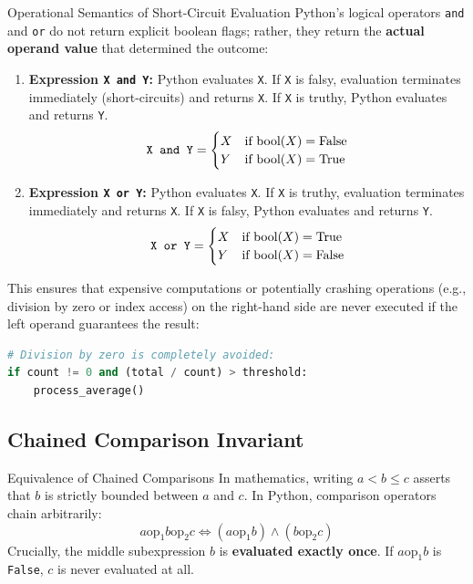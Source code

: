 \begin{theorembox}{Operational Semantics of Short-Circuit Evaluation}
Python's logical operators \texttt{and} and \texttt{or} do not return explicit boolean flags; rather, they return the \textbf{actual operand value} that determined the outcome:
\begin{enumerate}
    \item \textbf{Expression \texttt{X and Y}:}
    Python evaluates \texttt{X}. If \texttt{X} is falsy, evaluation terminates immediately (short-circuits) and returns \texttt{X}. If \texttt{X} is truthy, Python evaluates and returns \texttt{Y}.
    \begin{equation}
    \text{\texttt{X and Y}} = \begin{cases} X & \text{if } \text{bool}(X) = \text{False} \\ Y & \text{if } \text{bool}(X) = \text{True} \end{cases}
    \end{equation}
    \item \textbf{Expression \texttt{X or Y}:}
    Python evaluates \texttt{X}. If \texttt{X} is truthy, evaluation terminates immediately and returns \texttt{X}. If \texttt{X} is falsy, Python evaluates and returns \texttt{Y}.
    \begin{equation}
    \text{\texttt{X or Y}} = \begin{cases} X & \text{if } \text{bool}(X) = \text{True} \\ Y & \text{if } \text{bool}(X) = \text{False} \end{cases}
    \end{equation}
\end{enumerate}
This ensures that expensive computations or potentially crashing operations (e.g., division by zero or index access) on the right-hand side are never executed if the left operand guarantees the result:
\begin{lstlisting}[language=Python]
# Division by zero is completely avoided:
if count != 0 and (total / count) > threshold:
    process_average()
\end{lstlisting}
\end{theorembox}

\subsection{Chained Comparison Invariant}

\begin{theorembox}{Equivalence of Chained Comparisons}
In mathematics, writing $a < b \le c$ asserts that $b$ is strictly bounded between $a$ and $c$. In Python, comparison operators chain arbitrarily:
\begin{equation}
a \mathbin{\text{op}_1} b \mathbin{\text{op}_2} c \iff (a \mathbin{\text{op}_1} b) \land (b \mathbin{\text{op}_2} c)
\end{equation}
Crucially, the middle subexpression $b$ is \textbf{evaluated exactly once}. If $a \mathbin{\text{op}_1} b$ is \texttt{False}, $c$ is never evaluated at all.
\end{theorembox}

